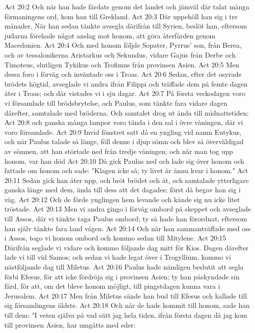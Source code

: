Act 20:2  Och när han hade färdats genom det landet och jämväl där talat många förmaningens ord, kom han till Grekland.
Act 20:3  Där uppehöll han sig i tre månader. När han sedan tänkte avsegla därifrån till Syrien, beslöt han, eftersom judarna förehade något anslag mot honom, att göra återfärden genom Macedonien.
Act 20:4  Och med honom följde Sopater, Pyrrus' son, från Berea, och av tessalonikerna Aristarkus och Sekundus, vidare Gajus från Derbe och Timoteus, slutligen Tykikus och Trofimus från provinsen Asien.
Act 20:5  Men dessa foro i förväg och inväntade oss i Troas.
Act 20:6  Sedan, efter det osyrade brödets högtid, avseglade vi andra ifrån Filippi och träffade dem på femte dagen åter i Troas; och där vistades vi i sju dagar.
Act 20:7  På första veckodagen voro vi församlade till brödsbrytelse, och Paulus, som tänkte fara vidare dagen därefter, samtalade med bröderna. Och samtalet drog ut ända till midnattstiden;
Act 20:8  och ganska många lampor voro tända i den sal i övre våningen, där vi voro församlade.
Act 20:9  Invid fönstret satt då en yngling vid namn Eutykus, och när Paulus talade så länge, föll denne i djup sömn och blev så överväldigad av sömnen, att han störtade ned från tredje våningen; och när man tog upp honom, var han död
Act 20:10  Då gick Paulus ned och lade sig över honom och fattade om honom och sade: "Klagen icke så; ty livet är ännu kvar i honom."
Act 20:11  Sedan gick han åter upp, och bröt brödet och åt, och samtalade ytterligare ganska länge med dem, ända till dess att det dagades; först då begav han sig i väg.
Act 20:12  Och de förde ynglingen hem levande och kände sig nu icke litet tröstade.
Act 20:13  Men vi andra gingo i förväg ombord på skeppet och avseglade till Assos, där vi tänkte taga Paulus ombord; ty så hade han förordnat, eftersom han själv tänkte fara land vägen.
Act 20:14  Och när han sammanträffade med oss i Assos, togo vi honom ombord och kommo sedan till Mitylene.
Act 20:15  Därifrån seglade vi vidare och kommo följande dag mitt för Kios. Dagen därefter lade vi till vid Samos; och sedan vi hade legat över i Trogyllium, kommo vi nästföljande dag till Miletus.
Act 20:16  Paulus hade nämligen beslutit att segla förbi Efesus, för att icke fördröja sig i provinsen Asien; ty han påskyndade sin färd, för att, om det bleve honom möjligt, till pingstdagen kunna vara i Jerusalem.
Act 20:17  Men från Miletus sände han bud till Efesus och kallade till sig församlingens äldste.
Act 20:18  Och när de hade kommit till honom, sade han till dem: "I veten själva på vad sätt jag hela tiden, ifrån första dagen då jag kom till provinsen Asien, har umgåtts med eder:
